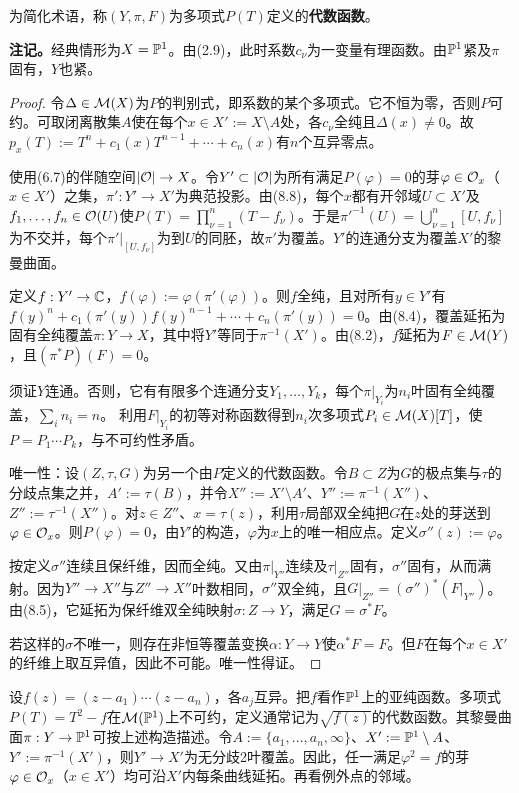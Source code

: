 为简化术语，称$(Y,\pi,F)$为多项式$P(T)$定义的\textbf{代数函数}。

\textbf{注记。}经典情形为$X=\mathbb P^1$。由(2.9)，此时系数$c_\nu$为一变量有理函数。由$\mathbb P^1$紧及$\pi$固有，$Y$也紧。
\begin{proof}
令$\Delta\in\mathcal M(X)$为$P$的判别式，即系数的某个多项式。它不恒为零，否则$P$可约。可取闭离散集$A$使在每个$x\in X':=X\setminus A$处，各$c_\nu$全纯且$\Delta(x)\ne0$。故$p_x(T):=T^n+c_1(x)T^{n-1}+\cdots+c_n(x)$有$n$个互异零点。

使用(6.7)的伴随空间$|\mathcal O|\to X$。令$Y'\subset|\mathcal O|$为所有满足$P(\varphi)=0$的芽$\varphi\in\mathcal O_x$（$x\in X'$）之集，$\pi':Y'\to X'$为典范投影。由(8.8)，每个$x$都有开邻域$U\subset X'$及$f_1,\ldots,f_n\in\mathcal O(U)$使$P(T)=\prod_{\nu=1}^n(T-f_\nu)$。于是$\pi'^{-1}(U)=\bigcup_{\nu=1}^n[U,f_\nu]$为不交并，每个$\pi'|_{[U,f_\nu]}$为到$U$的同胚，故$\pi'$为覆盖。$Y'$的连通分支为覆盖$X'$的黎曼曲面。

定义$f:Y'\to\mathbb C$，$f(\varphi):=\varphi(\pi'(\varphi))$。则$f$全纯，且对所有$y\in Y'$有$f(y)^n+c_1(\pi'(y))f(y)^{n-1}+\cdots+c_n(\pi'(y))=0$。由(8.4)，覆盖延拓为固有全纯覆盖$\pi:Y\to X$，其中将$Y'$等同于$\pi^{-1}(X')$。由(8.2)，$f$延拓为$F\in\mathcal M(Y)$，且$(\pi^*P)(F)=0$。

须证$Y$连通。否则，它有有限多个连通分支$Y_1,\ldots,Y_k$，每个$\pi|_{Y_i}$为$n_i$叶固有全纯覆盖，$\sum_i n_i=n$。
利用$F|_{Y_i}$的初等对称函数得到$n_i$次多项式$P_i\in\mathcal M(X)[T]$，使$P=P_1\cdots P_k$，与不可约性矛盾。

唯一性：设$(Z,\tau,G)$为另一个由$P$定义的代数函数。令$B\subset Z$为$G$的极点集与$\tau$的分歧点集之并，$A':=\tau(B)$，并令$X'':=X'\setminus A'$、$Y'':=\pi^{-1}(X'')$、$Z'':=\tau^{-1}(X'')$。对$z\in Z''$、$x=\tau(z)$，利用$\tau$局部双全纯把$G$在$z$处的芽送到$\varphi\in\mathcal O_x$。则$P(\varphi)=0$，由$Y'$的构造，$\varphi$为$x$上的唯一相应点。定义$\sigma''(z):=\varphi$。

按定义$\sigma''$连续且保纤维，因而全纯。又由$\pi|_{Y''}$连续及$\tau|_{Z''}$固有，$\sigma''$固有，从而满射。因为$Y''\to X''$与$Z''\to X''$叶数相同，$\sigma''$双全纯，且$G|_{Z''}=(\sigma'')^*(F|_{Y''})$。由(8.5)，它延拓为保纤维双全纯映射$\sigma:Z\to Y$，满足$G=\sigma^*F$。

若这样的$\sigma$不唯一，则存在非恒等覆盖变换$\alpha:Y\to Y$使$\alpha^*F=F$。但$F$在每个$x\in X'$的纤维上取互异值，因此不可能。唯一性得证。
\end{proof}
设$f(z)=(z-a_1)\cdots(z-a_n)$，各$a_j$互异。把$f$看作$\mathbb P^1$上的亚纯函数。多项式$P(T)=T^2-f$在$\mathcal M(\mathbb P^1)$上不可约，定义通常记为$\sqrt{f(z)}$的代数函数。其黎曼曲面$\pi:Y\to\mathbb P^1$可按上述构造描述。令$A:=\{a_1,\ldots,a_n,\infty\}$、$X':=\mathbb P^1\setminus A$、$Y':=\pi^{-1}(X')$，则$Y'\to X'$为无分歧2叶覆盖。因此，任一满足$\varphi^2=f$的芽$\varphi\in\mathcal O_x$（$x\in X'$）均可沿$X'$内每条曲线延拓。再看例外点的邻域。

